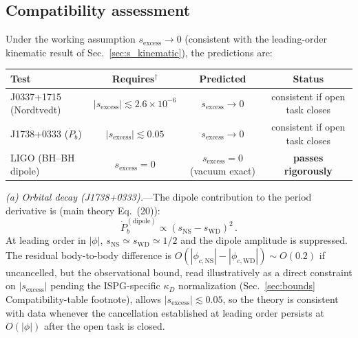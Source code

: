 \documentclass[11pt]{article}
\begin{document}
\subsection{Compatibility assessment}

Under the working assumption $s_{\mathrm{excess}}\to 0$
(consistent with the leading-order kinematic result of
Sec.~\ref{sec:s_kinematic}), the predictions are:

\begin{center}
\begin{tabular}{lccc}
\hline
Test & Requires$^{\dagger}$ & Predicted & Status \\
\hline
J0337+1715 (Nordtvedt) & $|s_{\mathrm{excess}}| \lesssim 2.6\times10^{-6}$
  & $s_{\mathrm{excess}} \to 0$ & consistent if open task closes \\
J1738+0333 ($\dot{P}_b$) & $|s_{\mathrm{excess}}| \lesssim 0.05$
  & $s_{\mathrm{excess}} \to 0$ & consistent if open task closes \\
LIGO (BH--BH dipole) & $s_{\mathrm{excess}} = 0$
  & $s_{\mathrm{excess}} = 0$ (vacuum exact) & \textbf{passes rigorously} \\
\hline
\end{tabular}
\end{center}
\smallskip{}

\textit{(a) Orbital decay (J1738+0333).}---The dipole
contribution to the period derivative is (main theory
Eq.~(20)):
\begin{equation}\label{eq:Pdot_dipole_app16}
  \dot{P}_b^{(\mathrm{dipole})} \propto
  (s_{\mathrm{NS}} - s_{\mathrm{WD}})^2\,.
\end{equation}
At leading order in $|\phi|$, $s_{\mathrm{NS}} \simeq
s_{\mathrm{WD}} \simeq 1/2$ and the dipole amplitude is
suppressed.  The residual body-to-body difference is
$O(|\phi_{c,\mathrm{NS}}| - |\phi_{c,\mathrm{WD}}|)
\sim O(0.2)$ if uncancelled, but the observational
bound, read illustratively as a direct constraint on
$|s_{\mathrm{excess}}|$ pending the ISPG-specific
$\kappa_D$ normalization (Sec.~\ref{sec:bounds}
Compatibility-table footnote), allows
$|s_{\mathrm{excess}}| \lesssim 0.05$, so the theory is
consistent with data whenever the cancellation
established at leading order persists at $O(|\phi|)$
after the open task is closed.
\end{document}
